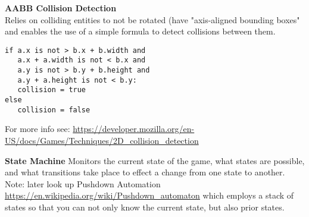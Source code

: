 \begin{definition}
\textbf{AABB Collision Detection}
\\
Relies on colliding entities to not be rotated (have "axis-aligned bounding boxes" and enables the use of a simple formula to detect collisions between them.
\begin{lstlisting}[language={[5.0]Lua}]
if a.x is not > b.x + b.width and
   a.x + a.width is not < b.x and
   a.y is not > b.y + b.height and
   a.y + a.height is not < b.y:
   collision = true
else
   collision = false
\end{lstlisting}

For more info see: \url{https://developer.mozilla.org/en-US/docs/Games/Techniques/2D_collision_detection}
\end{definition}

\begin{definition}
\textbf{State Machine}
Monitors the current state of the game, what states are possible, and what transitions take place to effect a change from one state to another.
\\
Note: later look up Pushdown Automation \url{https://en.wikipedia.org/wiki/Pushdown_automaton} which employs a stack of states so that you can not only know the current state, but also prior states.
\end{definition}
\newpage

